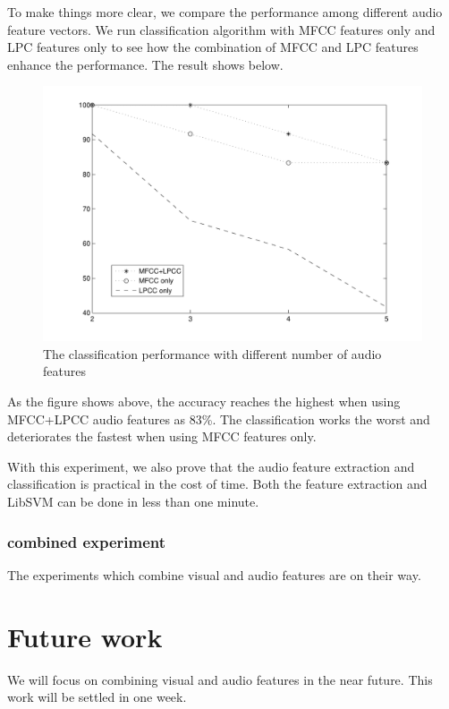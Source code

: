 \documentclass{article}
\begin{document}
  To make things more clear, we compare the performance among different audio feature vectors. We run classification algorithm with MFCC features only and LPC features only to see how the combination of MFCC and LPC features enhance the performance. The result shows below.
  
  \begin{figure}[H]
    \centering \includegraphics[width=\textwidth/2]{img/audio.pdf}
    \caption{The classification performance with different number of audio features}
  \end{figure}

  As the figure shows above, the accuracy reaches the highest when using MFCC+LPCC audio features as 83\%. The classification works the worst and deteriorates the fastest when using MFCC features only. 
  
  With this experiment, we also prove that the audio feature extraction and classification is practical in the cost of time. Both the feature extraction and LibSVM can be done in less than one minute.

\subsubsection{combined experiment}

The experiments which combine visual and audio features are on their way.

\section{Future work}

We will focus on combining visual and audio features in the near future. This work will be settled in one week.
\end{document}

